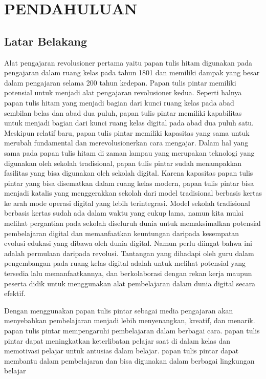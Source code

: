 \chapter{PENDAHULUAN}
\label{chap:pendahuluan}
\section{Latar Belakang}
\label{sec:latarbelakang}

Alat pengajaran revolusioner pertama yaitu papan tulis hitam digunakan pada pengajaran dalam ruang kelas pada tahun 1801 dan memiliki dampak yang besar dalam pengajaran selama 200 tahun kedepan. Papan tulis pintar memiliki potensial untuk menjadi alat pengajaran revolusioner kedua. Seperti halnya papan tulis hitam yang menjadi bagian dari kunci ruang kelas pada abad sembilan belas dan abad dua puluh, papan tulis pintar memiliki kapabilitas untuk menjadi bagian dari kunci ruang kelas digital pada abad dua puluh satu. Meskipun relatif baru, papan tulis pintar memiliki kapasitas yang sama untuk merubah fundamental dan merevolusionerkan cara mengajar.
Dalam hal yang sama pada papan tulis hitam di zaman lampau yang merupakan teknologi yang digunakan oleh sekolah tradisional, papan tulis pintar sudah menampakkan fasilitas yang bisa digunakan oleh sekolah digital. Karena kapasitas papan tulis pintar yang bisa disematkan dalam ruang kelas modern, papan tulis pintar bisa menjadi katalis yang menggerakkan sekolah dari model tradisional berbasis kertas ke arah mode operasi digital yang lebih terintegrasi. Model sekolah tradisional berbasis kertas sudah ada dalam waktu yang cukup lama, namun kita mulai melihat pergantian pada sekolah diseluruh dunia untuk memaksimalkan potensial pembelajaran digital dan memanfaatkan keuntungan daripada kesempatan evolusi edukasi yang dibawa oleh dunia digital.
Namun perlu diingat bahwa ini adalah permulaan daripada revolusi. Tantangan yang dihadapi oleh guru dalam pengembangan pada ruang kelas digital adalah untuk melihat potensial yang tersedia lalu memanfaatkannya, dan berkolaborasi dengan rekan kerja maupun peserta didik untuk menggunakan alat pembelajaran dalam dunia digital secara efektif.  \citep{Lant2016}

Dengan menggunakan papan tulis pintar sebagai media pengajaran akan menyebabkan pembelajaran menjadi lebih menyenangkan, kreatif, dan menarik. papan tulis pintar mempengaruhi pembelajaran dalam berbagai cara. papan tulis pintar dapat meningkatkan keterlibatan pelajar saat di dalam kelas dan memotivasi pelajar untuk antusias dalam belajar. papan tulis pintar dapat membantu dalam pembelajaran dan bisa digunakan dalam berbagai lingkungan belajar \citep{jelyani_janfaza_soori_2014}

